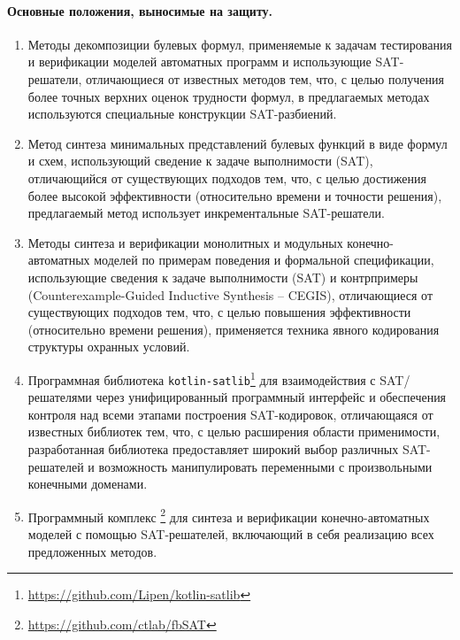 %
%
\paragraph{Основные положения, выносимые на защиту.}
%
%
\begin{enumerate}[beginpenalty=10000]
    \item Методы декомпозиции булевых формул, применяемые к задачам тестирования и верификации моделей автоматных программ и использующие SAT-решатели, отличающиеся от известных методов тем, что, с целью получения более точных верхних оценок трудности формул, в предлагаемых методах используются специальные конструкции SAT-разбиений.

    \item Метод синтеза минимальных представлений булевых функций в виде формул и схем, использующий сведение к задаче выполнимости (SAT), отличающийся от существующих подходов тем, что, с целью достижения более высокой эффективности (относительно времени и точности решения), предлагаемый метод использует инкрементальные SAT-решатели.

    \item Методы синтеза и верификации монолитных и модульных конечно-автоматных моделей по примерам поведения и формальной спецификации, использующие сведения к задаче выполнимости (SAT) и контрпримеры (Counterexample-Guided Inductive Synthesis \--- CEGIS), отличающиеся от существующих подходов тем, что, с целью повышения эффективности (относительно времени решения), применяется техника явного кодирования структуры охранных условий.

    \item Программная библиотека \texttt{kotlin-satlib}\footnote{\url{https://github.com/Lipen/kotlin-satlib}} для взаимодействия с SAT\-/решателями через унифицированный программный интерфейс и обеспечения контроля над всеми этапами построения SAT-кодировок, отличающаяся от известных библиотек тем, что, с целью расширения области применимости, разработанная библиотека предоставляет широкий выбор различных SAT-решателей и возможность манипулировать переменными с произвольными конечными доменами.

    \item Программный комплекс \footnote{\url{https://github.com/ctlab/fbSAT}} для синтеза и верификации конечно-автоматных моделей с помощью SAT-решателей, включающий в себя реализацию всех предложенных методов.
\end{enumerate}



